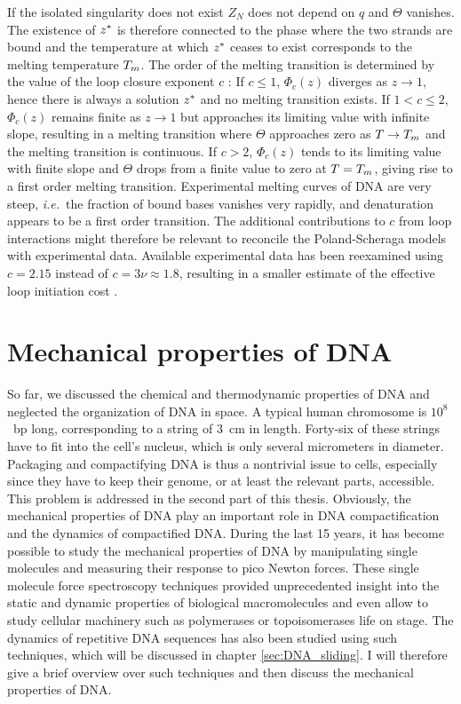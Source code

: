 If the isolated singularity does not exist $Z_N$ does not depend on $q$ and $\Theta$ vanishes. 
The existence of ${z^{*}}$ is therefore connected to the phase where 
the two strands are bound and the temperature at which ${z^{*}}$ ceases to exist corresponds to the 
melting temperature $T_m$. 
The order of the melting transition is 
determined by the value of the loop closure exponent $c$ \cite{Poland_JChemPhys_66b,Kafri_EPJE_02}: 
If $c\leq 1$, $\Phi_c(z)$ diverges as $z\to 1$, hence there is always a solution ${z^{*}}$ and no melting transition
exists. If $1\!<\!c\!\leq\!2$, $\Phi_c(z)$ remains finite as $z\to 1$ but approaches its limiting value
with infinite slope, resulting in a melting transition where $\Theta$ approaches zero as $T\to T_m$ and the 
melting transition is continuous.
If $c>2$, $\Phi_c(z)$ tends to its limiting value with finite slope and $\Theta$ drops from
a finite value to zero at $T=T_m$, giving rise to a first order melting transition.
Experimental melting curves of DNA are very steep, \emph{i.e.}~the fraction of bound bases vanishes 
very rapidly, and denaturation appears to be a first order transition. The additional contributions
to $c$ from loop interactions might therefore be relevant to reconcile the Poland-Scheraga models with experimental data. 
Available experimental data has been reexamined using $c=2.15$ instead of $c=3\nu\approx 1.8$, resulting in a smaller
estimate of the effective loop initiation cost \cite{Blossey_PRE_03}.


\section{\label{sec:DNA_mechanical_properties}Mechanical properties of DNA}
So far, we discussed the chemical and thermodynamic properties of DNA and 
neglected the organization of DNA in space. A typical human
chromosome is $10^{8}$~bp long, corresponding to a string of 3~cm in length. 
Forty-six of these strings have to fit into the cell's nucleus, which is only several micrometers
in diameter. Packaging and compactifying DNA is thus a nontrivial issue to cells, especially since
they have to keep their genome, or at least the relevant parts, accessible. This problem 
is addressed in the second part of this thesis. Obviously, the mechanical properties 
of DNA play an important role in DNA compactification and the dynamics of compactified DNA. 
During the last 15 years, it has become possible to study the mechanical properties of DNA by
 manipulating single molecules and measuring
their response to pico Newton forces. These single molecule force spectroscopy techniques provided
unprecedented insight into the static and dynamic properties of biological macromolecules 
and even allow to study cellular machinery such as polymerases or topoisomerases 
life on stage. The dynamics of repetitive DNA sequences
has also been studied using such techniques, which will be discussed in chapter \ref{sec:DNA_sliding}.
I will therefore give a brief overview
over such techniques and then discuss the mechanical properties of DNA.


